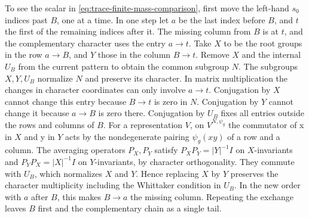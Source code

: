 To see the scalar in \eqref{eq:trace-finite-mass-comparison}, first
move the left-hand \(s_0\) indices past \(B\), one at a time. In one
step let \(a\) be the last index before \(B\), and \(t\) the first of
the remaining indices after it. The missing column from \(B\) is at
\(t\), and the complementary character uses the entry \(a\to t\).
Take \(X\) to be the root groups in the row \(a\to B\), and \(Y\)
those in the column \(B\to t\). Remove \(X\) and the internal
\(U_B\) from the current pattern to obtain the common subgroup \(N\).
The subgroups \(X,Y,U_B\) normalize \(N\) and preserve its character.
In matrix multiplication the changes in character coordinates can
only involve \(a\to t\). Conjugation by \(X\) cannot change this entry
because \(B\to t\) is zero in \(N\). Conjugation by \(Y\) cannot
change it because \(a\to B\) is zero there. Conjugation by \(U_B\)
fixes all entries outside the rows and columns of \(B\).
For a representation \(V\), on \(V^{N,\psi_g}\) the commutator of
x in \(X\) and y in \(Y\) acts by the nondegenerate pairing
\(\psi_g(xy)\) of a row and a column. The averaging operators \(P_X,P_Y\)
satisfy \(P_XP_Y=|Y|^{-1}I\) on \(X\)-invariants and
\(P_YP_X=|X|^{-1}I\) on \(Y\)-invariants, by character orthogonality.
They commute with \(U_B\), which normalizes \(X\) and \(Y\).
Hence replacing \(X\) by \(Y\) preserves the character multiplicity
including the Whittaker condition in \(U_B\). In the new order
with \(a\) after \(B\), this makes \(B\to a\) the missing column.
Repeating the exchange leaves \(B\) first and the complementary
chain as a single tail.

